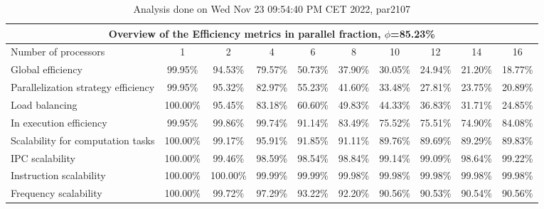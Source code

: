 \begin{table}[h]
\begin{center}
\begin{tabular}{|l|c|c|c|c|c|c|c|c|c|}
\hline
\multicolumn{10}{|c|}{Overview of the Efficiency metrics in parallel fraction, $\phi$=85.23\%} \\
\hline
\hline
Number of processors & 1 & 2 & 4 & 6 & 8 & 10 & 12 & 14 & 16 \\
\hline
\hline
Global efficiency                      &     99.95\% &     94.53\% &     79.57\% &     50.73\% &     37.90\% &     30.05\% &     24.94\% &     21.20\% &     18.77\% \\
\hline
\hline
Parallelization strategy efficiency &     99.95\% &     95.32\% &     82.97\% &     55.23\% &     41.60\% &     33.48\% &     27.81\% &     23.75\% &     20.89\% \\
\hline
Load balancing                   &    100.00\% &     95.45\% &     83.18\% &     60.60\% &     49.83\% &     44.33\% &     36.83\% &     31.71\% &     24.85\% \\
In execution efficiency          &     99.95\% &     99.86\% &     99.74\% &     91.14\% &     83.49\% &     75.52\% &     75.51\% &     74.90\% &     84.08\% \\
\hline
\hline
Scalability for computation tasks   &    100.00\% &     99.17\% &     95.91\% &     91.85\% &     91.11\% &     89.76\% &     89.69\% &     89.29\% &     89.83\% \\
\hline
IPC scalability                  &    100.00\% &     99.46\% &     98.59\% &     98.54\% &     98.84\% &     99.14\% &     99.09\% &     98.64\% &     99.22\% \\
Instruction scalability          &    100.00\% &    100.00\% &     99.99\% &     99.99\% &     99.98\% &     99.98\% &     99.98\% &     99.98\% &     99.98\% \\
Frequency scalability            &    100.00\% &     99.72\% &     97.29\% &     93.22\% &     92.20\% &     90.56\% &     90.53\% &     90.54\% &     90.56\% \\
\hline
\end{tabular}
\end{center}
\caption{ Analysis done on Wed Nov 23 09:54:40 PM CET 2022, par2107}
\end{table}
